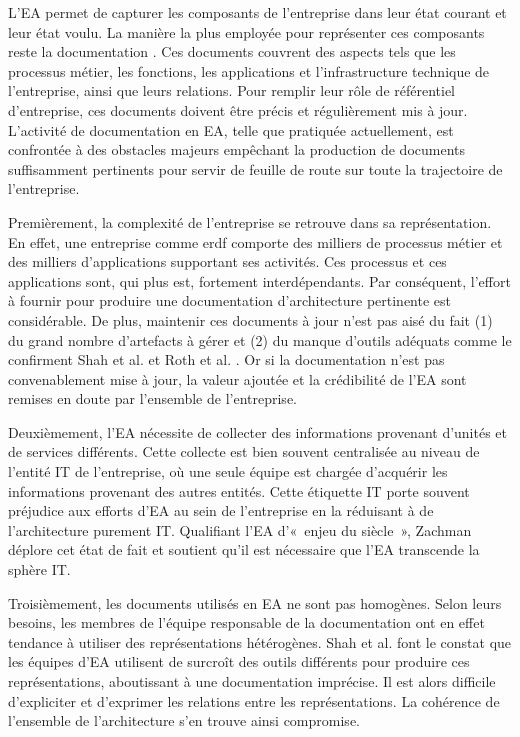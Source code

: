L'EA permet de capturer les composants de l'entreprise dans leur état courant
et leur état voulu. La manière la plus employée pour représenter ces composants
reste la documentation \cite{barn2013enterprise}. Ces documents couvrent des
aspects tels que les processus métier, les fonctions, les applications et
l'infrastructure technique de l'entreprise, ainsi que leurs relations. Pour
remplir leur rôle de référentiel d'entreprise, ces documents doivent être
précis et régulièrement mis à jour. L'activité de documentation en EA, telle
que pratiquée actuellement, est confrontée à des obstacles majeurs empêchant la
production de documents suffisamment pertinents pour servir de feuille de route
sur toute la trajectoire de l'entreprise.

Premièrement, la complexité de l'entreprise se retrouve dans sa représentation.
En effet, une entreprise comme \gls{erdf} comporte des milliers de processus
métier et des milliers d'applications supportant ses activités.  Ces processus
et ces applications sont, qui plus est, fortement interdépendants. Par
conséquent, l'effort à fournir pour produire une documentation d'architecture
pertinente est considérable. De plus, maintenir ces documents à jour n'est pas
aisé du fait (1) du grand nombre d'artefacts à gérer et (2) du manque d'outils
adéquats comme le confirment Shah et al. \cite{shah2007frameworks} et Roth et
al. \cite{roth2013enterprise}. Or si la documentation n'est pas convenablement
mise à jour, la valeur ajoutée et la crédibilité de l'EA sont remises en doute
par l'ensemble de l'entreprise.

Deuxièmement, l'EA nécessite de collecter des informations provenant d'unités
et de services différents. Cette collecte est bien souvent centralisée au
niveau de l'entité IT de l'entreprise, où une seule équipe est chargée
d'acquérir les informations provenant des autres entités. Cette étiquette IT
porte souvent préjudice aux efforts d'EA au sein de l'entreprise en la
réduisant à de l'architecture purement IT. Qualifiant l'EA d'«~enjeu du
siècle~», Zachman déplore cet état de fait et soutient qu'il est nécessaire que
l'EA transcende la sphère IT.

Troisièmement, les documents utilisés en EA ne sont pas homogènes. Selon leurs
besoins, les membres de l'équipe responsable de la documentation ont en effet
tendance à utiliser des représentations hétérogènes. Shah et al.
\cite{shah2007frameworks} font le constat que les équipes d'EA utilisent de
surcroît des outils différents pour produire ces représentations, aboutissant à
une documentation imprécise. Il est alors difficile d'expliciter et d'exprimer
les relations entre les représentations. La cohérence de l'ensemble de
l'architecture s'en trouve ainsi compromise.

